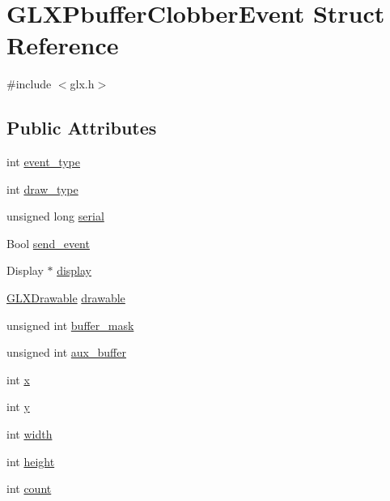 \hypertarget{struct_g_l_x_pbuffer_clobber_event}{}\section{G\+L\+X\+Pbuffer\+Clobber\+Event Struct Reference}
\label{struct_g_l_x_pbuffer_clobber_event}


{\ttfamily \#include $<$glx.\+h$>$}

\subsection*{Public Attributes}
\begin{DoxyCompactItemize}
\item 
int \hyperlink{struct_g_l_x_pbuffer_clobber_event_a30d7162d8d77246b01f5e610cda4da68}{event\+\_\+type}
\item 
int \hyperlink{struct_g_l_x_pbuffer_clobber_event_a243f92b79d3cfbde73eab02815be2320}{draw\+\_\+type}
\item 
unsigned long \hyperlink{struct_g_l_x_pbuffer_clobber_event_a6390b2875ae06a4cb827d2b4c321eda3}{serial}
\item 
Bool \hyperlink{struct_g_l_x_pbuffer_clobber_event_aa51969e67e4ad6095bda26ca64fe8ba6}{send\+\_\+event}
\item 
Display $\ast$ \hyperlink{struct_g_l_x_pbuffer_clobber_event_aeb49bb93cc59448e75d66170a39596d1}{display}
\item 
\hyperlink{glx_8h_a826f51745d9d6c81bdbac47ae2b80cf7}{G\+L\+X\+Drawable} \hyperlink{struct_g_l_x_pbuffer_clobber_event_a388908b766e35205c1a461ea8b60439f}{drawable}
\item 
unsigned int \hyperlink{struct_g_l_x_pbuffer_clobber_event_aff4c23d00f6dad98427f8d32a5f10580}{buffer\+\_\+mask}
\item 
unsigned int \hyperlink{struct_g_l_x_pbuffer_clobber_event_a13193b6e7e3e52b15f754fe91403b7ec}{aux\+\_\+buffer}
\item 
int \hyperlink{struct_g_l_x_pbuffer_clobber_event_a8f0a7162a033c89ee94ce535580dbc32}{x}
\item 
int \hyperlink{struct_g_l_x_pbuffer_clobber_event_a69eb7ac60d36ac3ec4550ac206cfc61f}{y}
\item 
int \hyperlink{struct_g_l_x_pbuffer_clobber_event_aaca375fecb872c73c60cd5d0bfc7c7a5}{width}
\item 
int \hyperlink{struct_g_l_x_pbuffer_clobber_event_aed4e539c896bdad15217bf92c28f8520}{height}
\item 
int \hyperlink{struct_g_l_x_pbuffer_clobber_event_a61e9f6b31738464dca67f909fcacd298}{count}
\end{DoxyCompactItemize}


